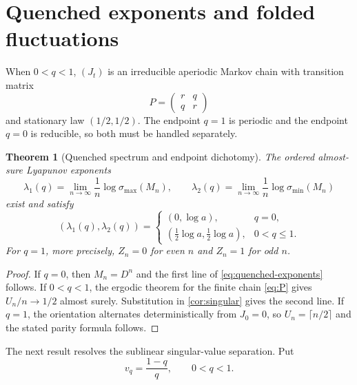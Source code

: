 \documentclass[11pt,a4paper]{amsart}
\newtheorem{theorem}{Theorem}[section]
\theoremstyle{definition}
\theoremstyle{remark}
\begin{document}
\section{Quenched exponents and folded fluctuations}
\label{sec:quenched}

When $0<q<1$, $(J_t)$ is an irreducible aperiodic Markov chain with
transition matrix
\begin{equation}\label{eq:P}
 P=\begin{pmatrix}r&q\\q&r\end{pmatrix}
\end{equation}
and stationary law $(1/2,1/2)$.  The endpoint $q=1$ is periodic and the
endpoint $q=0$ is reducible, so both must be handled separately.

\begin{theorem}[Quenched spectrum and endpoint dichotomy]
\label{thm:quenched}
The ordered almost-sure Lyapunov exponents
\[
 \lambda_1(q)=\lim_{n\to\infty}\frac1n\log\sigma_{\max}(M_n),
 \qquad
 \lambda_2(q)=\lim_{n\to\infty}\frac1n\log\sigma_{\min}(M_n)
\]
exist and satisfy
\begin{equation}\label{eq:quenched-exponents}
 (\lambda_1(q),\lambda_2(q))=
 \begin{cases}
 (0,\log a),&q=0,\\[2pt]
 (\frac12\log a,\frac12\log a),&0<q\leq1.
 \end{cases}
\end{equation}
For $q=1$, more precisely, $Z_n=0$ for even $n$ and $Z_n=1$ for odd
$n$.
\end{theorem}

\begin{proof}
If $q=0$, then $M_n=D^n$ and the first line of
\eqref{eq:quenched-exponents} follows.  If $0<q<1$, the ergodic theorem
for the finite chain \eqref{eq:P} gives $U_n/n\to1/2$ almost surely.
Substitution in \cref{cor:singular} gives the second line.  If $q=1$,
the orientation alternates deterministically from $J_0=0$, so
$U_n=\lceil n/2\rceil$ and the stated parity formula follows.
\end{proof}

The next result resolves the sublinear singular-value separation.  Put
\begin{equation}\label{eq:variance}
 v_q=\frac{1-q}{q},\qquad 0<q<1.
\end{equation}
\end{document}
